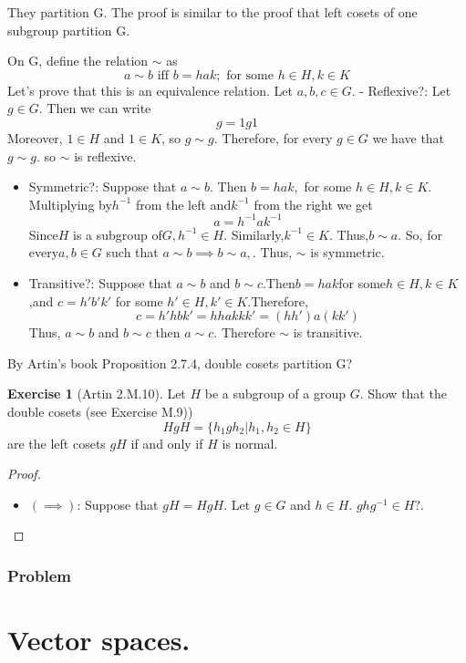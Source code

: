 \documentclass[
]{book}
\providecommand{\tightlist}{%
  \setlength{\itemsep}{0pt}\setlength{\parskip}{0pt}}
\theoremstyle{definition}
\theoremstyle{definition}
\theoremstyle{definition}
\newtheorem{exercise}{Exercise}[chapter]
\theoremstyle{definition}
\theoremstyle{remark}
\begin{document}
They partition G. The proof is similar to the proof that left cosets of one subgroup partition G.

On G, define the relation \(\sim\) as
\[ a \sim b \text{ iff } b = hak; \text{ for some } h \in H, k \in K\]
Let's prove that this is an equivalence relation.
Let \(a,b,c\in G\).
- Reflexive?:
Let \(g \in G\). Then we can write
\[ g = 1g1\]
Moreover, \(1 \in H\) and \(1 \in K\), so \(g \sim g\).
Therefore, for every \(g \in G\) we have that \(g \sim g\). so \(\sim\) is reflexive.

\begin{itemize}
\item
  Symmetric?:
  Suppose that \(a \sim b.\) Then \(b = hak,\) for some \(h \in H, k \in K.\) Multiplying by\(h^{-1}\) from the left and\(k^{-1}\) from the right we get
  \[ a = h^{-1}ak^{-1}\]
  Since\(H\) is a subgroup of\(G,h^{-1} \in H.\) Similarly,\(k^{-1} \in K.\) Thus,\(b \sim a.\)
  So, for every\(a,b \in G\) such that \(a \sim b\implies b \sim a,\). Thus, \(\sim\) is symmetric.
\item
  Transitive?:
  Suppose that \(a \sim b\) and \(b \sim c\).Then\(b = hak\)for some\(h \in H,k \in K\),and \(c=h'b'k'\) for some \(h' \in H,k' \in K\).Therefore,
  \[c=h'hbk'=hhakkk'= (hh')a(kk')\]
  Thus, \(a\sim b\) and \(b\sim c\) then \(a\sim c\). Therefore \(\sim\) is transitive.
\end{itemize}

By Artin's book Proposition 2.7.4, double cosets partition G?

\begin{exercise}[Artin 2.M.10]
\protect\hypertarget{exr:unnamed-chunk-169}{}\label{exr:unnamed-chunk-169}Let \(H\) be a subgroup of a group \(G\). Show that the double cosets (see Exercise M.9))
\[HgH = \{h_1gh_2 | h_1, h_2 \in H\}\]
are the left cosets \(gH\) if and only if \(H\) is normal.
\end{exercise}

\begin{proof}
\leavevmode

\begin{itemize}
\tightlist
\item
  \((\implies)\): Suppose that \(gH=HgH\). Let \(g\in G\) and \(h\in H\).
  \(ghg^{-1}\in H?\).
\end{itemize}

\end{proof}

\hypertarget{problem-3}{%
\subsection{Problem}\label{problem-3}}

\hypertarget{vector-spaces.}{%
\chapter{Vector spaces.}\label{vector-spaces.}}

  
\end{document}
